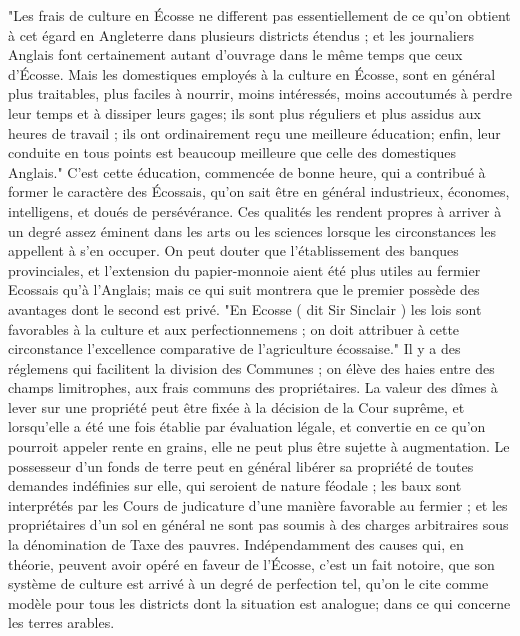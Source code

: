 "Les frais de culture en Écosse ne different pas essentiellement de ce qu'on obtient à cet égard en Angleterre dans plusieurs districts étendus ; et les journaliers Anglais font certainement autant d'ouvrage dans le même temps que ceux d'Écosse. Mais les domestiques employés à la culture en Écosse, sont en général plus traitables, plus faciles à nourrir, moins intéressés, moins accoutumés à perdre leur temps et à dissiper leurs gages; ils sont plus réguliers et plus assidus aux heures de travail ; ils ont ordinairement reçu une meilleure éducation; enfin, leur conduite en tous points est beaucoup meilleure que celle des domestiques Anglais."
C'est cette éducation, commencée de bonne heure, qui a contribué à former le caractère des Écossais, qu'on sait être en général industrieux, économes, intelligens, et doués de persévérance. Ces qualités les rendent propres à arriver à un degré assez éminent\setcounter{page}{412} dans les arts ou les sciences lorsque les circonstances les appellent à s'en occuper.
On peut douter que l'établissement des banques provinciales, et l'extension du papier-monnoie aient été plus utiles au fermier Ecossais qu'à l'Anglais; mais ce qui suit montrera que le premier possède des avantages dont le second est privé.
"En Ecosse ( dit Sir Sinclair ) les lois sont favorables à la culture et aux perfectionnemens ; on doit attribuer à cette circonstance l'excellence comparative de l'agriculture écossaise."
Il y a des réglemens qui facilitent la division des Communes ; on élève des haies entre des champs limitrophes, aux frais communs des propriétaires. La valeur des dîmes à lever sur une propriété peut être fixée à la décision de la Cour suprême, et lorsqu'elle a été une fois établie par évaluation légale, et convertie en ce qu'on pourroit appeler rente en grains, elle ne peut plus être sujette à augmentation. Le possesseur d'un fonds de terre peut en général libérer sa propriété de toutes demandes indéfinies sur elle, qui seroient de nature féodale ; les baux sont interprétés par les Cours de judicature d'une manière favorable au fermier ; et les propriétaires d'un sol en général ne sont pas soumis à des\setcounter{page}{413} charges arbitraires sous la dénomination de Taxe des pauvres.
Indépendamment des causes qui, en théorie, peuvent avoir opéré en faveur de l'Écosse, c'est un fait notoire, que son système de culture est arrivé à un degré de perfection tel, qu'on le cite comme modèle pour tous les districts dont la situation est analogue; dans ce qui concerne les terres arables.
